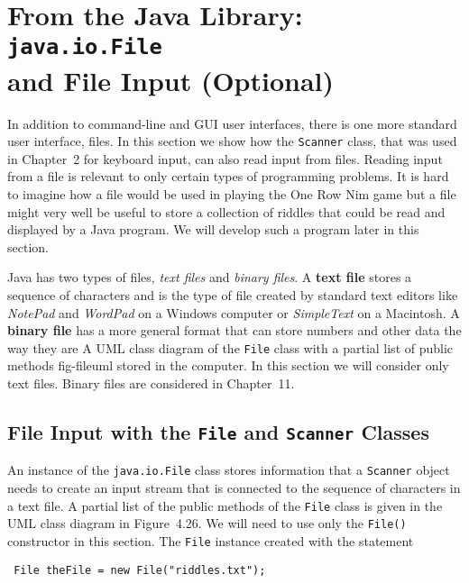 \section{From the Java Library: {\tt java.io.File} \\ and File Input (Optional)}

\label{pg-sec-fileclass}

In addition to command-line and GUI user interfaces, there is one more
standard user interface, files. In this section we show how the {\tt Scanner} 
class, that was used in Chapter~2 for keyboard input, can also 
read input from files.  Reading input from
a file is relevant to only certain types of programming problems.  
It is hard to imagine how a file would be used in playing the One Row Nim 
game but a file might very well be useful to store a collection of riddles
that could be read and displayed by a Java program.  We will develop such a 
program later in this section.

Java has two types of files, {\it text files} and {\it binary files}.  
A {\bf text file} stores a sequence of characters and is the type of
file created by standard text editors like {\it NotePad} and {\it WordPad}
on a Windows computer or {\it SimpleText} on a Macintosh. A {\bf binary file}
has a more general format that can store numbers and other data the way they are
 {A UML class diagram of the {\tt File}
 class with a partial list of public methods }
{fig-fileuml}
stored in the computer.  In this section we will consider only text files. Binary
files are considered in Chapter~11.


\subsection{File Input with the {\tt File} and {\tt Scanner} Classes} 

An instance of the {\tt java.io.File} class stores information that
a {\tt Scanner} object needs to create an input stream that is connected
to the sequence of characters in a text file. A partial list of the
public methods of the {\tt File} class is given in the UML class diagram 
in Figure~4.26.  We will need to use only the {\tt File()}
constructor in this section.  The {\tt File} instance created with the 
statement

\begin{jjjlisting}
\begin{lstlisting}
 File theFile = new File("riddles.txt");
\end{lstlisting}
\end{jjjlisting}

